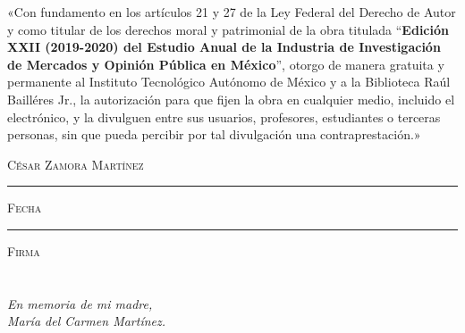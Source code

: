 \documentclass[11pt, oneside]{book}
\begin{document}

\thispagestyle{empty}

\vspace*{\fill}
\begingroup

\noindent
«Con fundamento en los artículos 21 y 27 de la Ley Federal del Derecho de Autor y como titular de los derechos moral y patrimonial de la obra titulada ``\textbf{Edición XXII (2019-2020) del Estudio Anual de la Industria de Investigación de Mercados y Opinión Pública en México}'', otorgo de manera gratuita y permanente al Instituto Tecnológico Autónomo de México y a la Biblioteca Raúl Bailléres Jr., la autorización para que fijen la obra en cualquier medio, incluido el electrónico, y la divulguen entre sus usuarios, profesores, estudiantes o terceras personas, sin que pueda percibir por tal divulgación una contraprestación.»


\centering 

\vspace{5em}

\textsc{César Zamora Martínez}

\vspace{5em}

\rule[1em]{20em}{0.5pt} %

\textsc{Fecha}
 
\vspace{8em}

\rule[1em]{20em}{0.5pt} %

\textsc{Firma}

\endgroup
\vspace*{\fill}


\pagestyle{plain}
\frontmatter

\chapter*{}

\begin{flushright}
\textit{En memoria de mi madre, \\ María del Carmen Martínez.}
\end{flushright}
\end{document}
